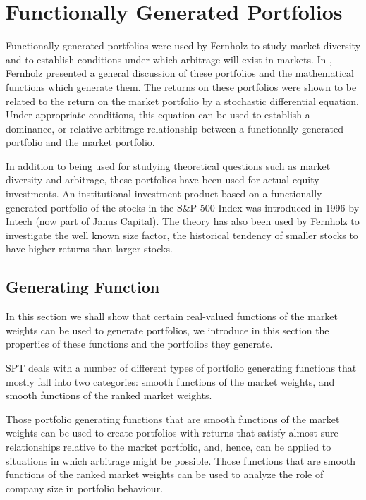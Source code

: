 \documentclass[british]{amsart} \usepackage{lmodern}
\numberwithin{equation}{section} \numberwithin{figure}{section}
\theoremstyle{plain} \newtheorem{thm}{\protect\theoremname}[section]
\theoremstyle{definition} \newtheorem{defn}[thm]{\protect\definitionname}
\theoremstyle{plain} \newtheorem{assumption}[thm]{\protect\assumptionname}
\theoremstyle{plain} \newtheorem{lem}[thm]{\protect\lemmaname}
\theoremstyle{plain} \newtheorem{prop}[thm]{\protect\propositionname}
\theoremstyle{remark} \newtheorem{rem}[thm]{\protect\remarkname}
\theoremstyle{plain} \newtheorem{cor}[thm]{\protect\corollaryname}
\begin{document}
\newpage
\section{Functionally Generated Portfolios}

Functionally generated portfolios were used by Fernholz
\cite{fernholz1999diversity} to study market diversity and to establish
conditions under which arbitrage will exist in markets. In
\cite{fernholz1999pgf}, Fernholz presented a general discussion of these
portfolios and the mathematical functions which generate them. The returns on
these portfolios were shown to be related to the return on the market portfolio
by a stochastic differential equation. Under appropriate conditions, this
equation can be used to establish a dominance, or relative arbitrage
relationship between a functionally generated portfolio and the market
portfolio.

In addition to being used for studying theoretical questions such as market
diversity and arbitrage, these portfolios have been used for actual equity
investments. An institutional investment product based on a functionally
generated portfolio of the stocks in the S\&P 500 Index was introduced in 1996 by
Intech (now part of Janus Capital). The theory has also been used by Fernholz
\cite{fernholz1999diversity} to investigate the well known size factor, the
historical tendency of smaller stocks to have higher returns than larger stocks.

\subsection{Generating Function}

In this section we shall show that certain real-valued functions of the market
weights can be used to generate portfolios, we introduce in this section the
properties of these functions and the portfolios they generate. 

SPT deals with a number of different types of portfolio generating functions
that mostly fall into two categories: smooth functions of the market weights, 
and smooth functions of the ranked market weights. 

Those portfolio generating functions that are smooth functions of the market
weights can be used to create portfolios with returns that satisfy almost sure
relationships relative to the market portfolio, and, hence, can be applied to
situations in which arbitrage might be possible. Those functions that are smooth
functions of the ranked market weights can be used to analyze the role of
company size in portfolio behaviour.
\end{document}
